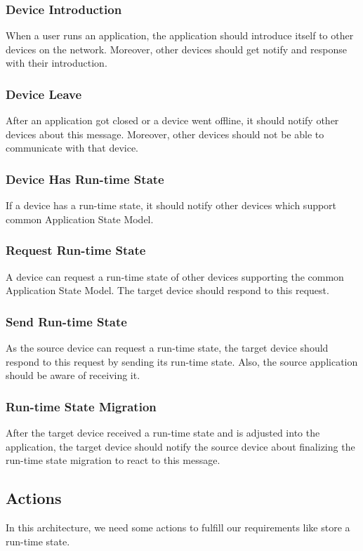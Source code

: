 \subsubsection{Device Introduction}
When a user runs an application, the application should introduce itself to other devices on the network. Moreover, other devices should get notify and response with their introduction.

\subsubsection{Device Leave}
After an application got closed or a device went offline, it should notify other devices about this message. Moreover, other devices should not be able to communicate with that device.

\subsubsection{Device Has Run-time State}
If a device has a run-time state, it should notify other devices which support  common Application State Model.

\subsubsection{Request Run-time State}
A device can request a run-time state of other devices supporting the common Application State Model. The target device should respond to this request.

\subsubsection{Send Run-time State}
As the source device can request a run-time state, the target device should respond to this request by sending its run-time state. Also, the source application should be aware of receiving it.

\subsubsection{Run-time State Migration}
After the target device received a run-time state and is adjusted into the application, the target device should notify the source device about finalizing the run-time state migration to react to this message.

\subsection{Actions}
In this architecture, we need some actions to fulfill our requirements like store a run-time state.

